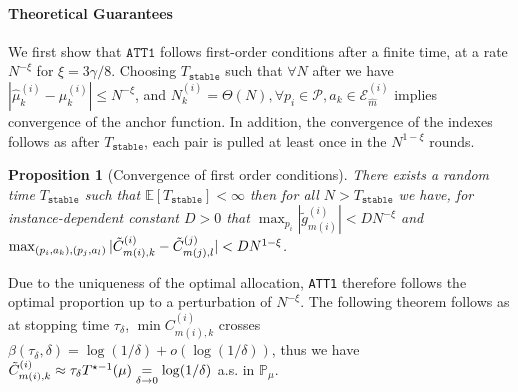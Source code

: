 \documentclass{article}
\newcommand{\stable}{\texttt{stable}}
\newcommand{\E}{\mathbb{E}}
\newtheorem{proposition}[theorem]{Proposition}
\begin{document}
\paragraph{Theoretical Guarantees} We first show that $\texttt{ATT1}$ follows first-order conditions after a finite time, at a rate $N^{-\xi}$ for $\xi=3\gamma/8$. Choosing $T_{\texttt{stable}}$ such that $\forall N$ after we have $|\hat{\mu}^{(i)}_k - \mu^{(i)}_k| \leq N^{-\xi}$, and $N^{(i)}_k=\Theta(N),\forall p_i\in \mathcal{P},a_k\in \mathcal{E}_{\hat{m}}^{(i)}$ implies convergence of the anchor function. In addition, the convergence of the indexes follows as after $T_{\texttt{stable}}$, each pair is pulled at least once in the $N^{1-\xi}$ rounds.
\begin{proposition}[Convergence of first order conditions]
There exists a random time $T_{\texttt{stable}}$ such that $\E[T_{\texttt{stable}}]<\infty$ then for all $N>T_{\texttt{stable}}$ we have, for instance-dependent constant $D>0$ that $ \max_{p_i} |\tilde{g}^{(i)}_{m(i)}|<DN^{-\xi}$ and $
        \max_{(p_i,a_k),(p_j,a_l)}|\Tilde{C}^{(i)}_{m(i),k}-\Tilde{C}^{(j)}_{m(j),l}|<DN^{1-\xi}$.
\end{proposition}
Due to the uniqueness of the optimal allocation, \texttt{ATT1} therefore follows the optimal proportion up to a perturbation of $N^{-\xi}$. The following theorem follows as at stopping time $\tau_{\delta}$, $\min C^{(i)}_{m(i),k}$ crosses $\beta(\tau_{\delta},\delta)=\log(1/\delta)+o(\log(1/\delta))$, thus we have $\Tilde{C}^{(i)}_{m(i),k}\approx \tau_{\delta}T^{\star{-1}}(\mu)\underset{\delta\to 0}{=}\log(1/\delta)$ a.s. in $\mathbb{P}_{\mu}$. 
\end{document}
